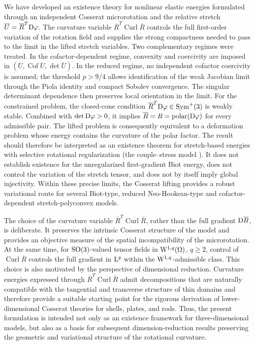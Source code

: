 \documentclass[11pt]{article}
\begin{document}
We have developed an existence theory for nonlinear elastic energies formulated through an independent Cosserat microrotation and the relative stretch $ \overline U =  \overline R ^T{\rm D}\varphi$. The curvature variable $  \overline R ^T\operatorname{Curl}  \overline R $ controls the full first-order variation of the rotation field and supplies the strong compactness needed to pass to the limit in the lifted stretch variables.
 Two complementary regimes were treated. In the cofactor-dependent regime, convexity and coercivity are imposed in $(  \overline U ,\operatorname{Cof}  \overline U ,\det  \overline U )$. In the reduced regime, no independent cofactor coercivity is assumed; the threshold $p>9/4$ allows identification of the weak Jacobian limit through the Piola identity and compact Sobolev convergence. The singular determinant dependence then preserves local orientation in the limit.
 For the constrained problem, the closed-cone condition $  \overline R ^T{\rm D}\varphi\in\operatorname{Sym}^{+}(3)$ is weakly stable. Combined with $\det{\rm D}\varphi>0$, it implies $  \overline R =R=\operatorname{polar}({\rm D}\varphi)$ for every admissible pair. The lifted problem is consequently equivalent to a deformation problem whose energy contains the curvature of the polar factor. The result should therefore be interpreted as an existence theorem for stretch-based energies with selective rotational regularization (the couple--stress model \cite{Toupin62,sky2026cosserat}). It does not establish existence for the unregularized first-gradient Biot energy, does not control the variation of the stretch tensor, and does not by itself imply global injectivity. Within these precise limits, the Cosserat lifting provides a robust variational route for several Biot-type, reduced Neo-Hookean-type and cofactor-dependent stretch-polyconvex models.


The choice of the curvature variable $ \overline R^{T}\operatorname{Curl}\overline R$, rather than the full gradient ${\rm D} \overline R$, is deliberate. It preserves the intrinsic Cosserat structure of the model and provides an objective measure of the spatial incompatibility of the microrotation. At the same time, for ${\rm SO}(3)$-valued tensor fields in
${\rm W}^{1,q}(\Omega)$, $q\geq2$, control of
$\operatorname{Curl}\overline R$ controls the full gradient in
${\rm L}^q$ within the ${\rm W}^{1,q}$-admissible class. This choice is also motivated by the perspective of dimensional reduction. Curvature energies expressed through $ \overline R^{T}\operatorname{Curl} \overline R$ admit decompositions that are naturally compatible with the tangential and transverse structure of thin domains and therefore provide a suitable starting point for the rigorous derivation of lower-dimensional Cosserat theories for shells, plates, and rods. Thus, the present formulation is intended not only as an existence framework for three-dimensional models, but also as a basis for subsequent dimension-reduction results preserving the geometric and variational structure of the rotational curvature.
 
\end{document}
